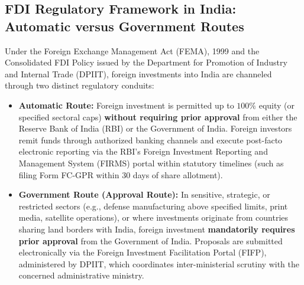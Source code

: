 \vspace{0.3em}

\subsection{FDI Regulatory Framework in India: Automatic versus Government Routes}
Under the Foreign Exchange Management Act (FEMA), 1999 and the Consolidated FDI Policy issued by the Department for Promotion of Industry and Internal Trade (DPIIT), foreign investments into India are channeled through two distinct regulatory conduits:

\begin{itemize}[leftmargin=1.5em]
    \item \textbf{Automatic Route:} Foreign investment is permitted up to $100\%$ equity (or specified sectoral caps) \textbf{without requiring prior approval} from either the Reserve Bank of India (RBI) or the Government of India. Foreign investors remit funds through authorized banking channels and execute post-facto electronic reporting via the RBI's Foreign Investment Reporting and Management System (FIRMS) portal within statutory timelines (such as filing Form FC-GPR within 30 days of share allotment).
    \item \textbf{Government Route (Approval Route):} In sensitive, strategic, or restricted sectors (e.g., defense manufacturing above specified limits, print media, satellite operations), or where investments originate from countries sharing land borders with India, foreign investment \textbf{mandatorily requires prior approval} from the Government of India. Proposals are submitted electronically via the Foreign Investment Facilitation Portal (FIFP), administered by DPIIT, which coordinates inter-ministerial scrutiny with the concerned administrative ministry.
\end{itemize}

\vspace{0.3em}


